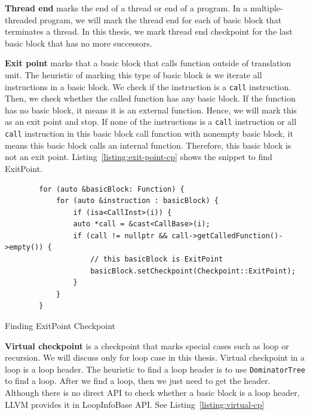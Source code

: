 \vspace{0.5cm}
\noindent \textbf{Thread end} marks the end of a thread or end of a program. In
a multiple-threaded program, we will mark the thread end for each of basic block
that terminates a thread. In this thesis, we mark thread end checkpoint for the
last basic block that has no more successors.

\vspace{0.5cm}
\noindent \textbf{Exit point} marks that a basic block that calls function
outside of translation unit. The heuristic of marking this type of basic block
is we iterate all instructions in a basic block. We check if the instruction is
a \texttt{call} instruction. Then, we check whether the called function has any
basic block. If the function has no basic block, it means it is an external
function. Hence, we will mark this as an exit point and stop. If none of the
instructions is a \texttt{call} instruction or all \texttt{call} instruction in
this basic block call function with nonempty basic block, it means this basic
block calls an internal function. Therefore, this basic block is not an exit
point. Listing~\ref{listing:exit-point-cp} shows the snippet to find ExitPoint.

\begin{listing}[htbp]
    \begin{verbatim}
        for (auto &basicBlock: Function) {
            for (auto &instruction : basicBlock) {
                if (isa<CallInst>(i)) {
                auto *call = &cast<CallBase>(i);
                if (call != nullptr && call->getCalledFunction()->empty()) {
                    // this basicBlock is ExitPoint
                    basicBlock.setCheckpoint(Checkpoint::ExitPoint);
                } 
            }
        } 
    \end{verbatim}
    \caption{Finding ExitPoint Checkpoint}    
    \label{listing:exit-point-cp}
\end{listing}

\vspace{0.5cm}
\noindent \textbf{Virtual checkpoint} is a checkpoint that marks special cases
such as loop or recursion. We will discuss only for loop case in this thesis.
Virtual checkpoint in a loop is a loop header. The heuristic to find a loop
header is to use \texttt{DominatorTree} to find a loop. After we find a loop,
then we just need to get the header. Although there is no direct API to check
whether a basic block is a loop header, LLVM provides it in LoopInfoBase API.
See Listing~\ref{listing:virtual-cp}

